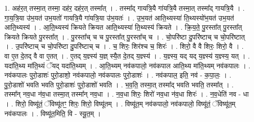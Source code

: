 \documentclass[17pt]{extarticle}
\begin{document}
1. अह॑र॒त् तस्मा॒त् तस्मा॒ दह॑र॒ दह॑र॒त् तस्मा᳚त् । . तस्मा᳚द् गायत्रि॒यै गा॑यत्रि॒यै तस्मा॒त् तस्मा᳚द् गायत्रि॒यै । . गा॒य॒त्रि॒या उ॑भ॒यत॑ उभ॒यतो॑ गायत्रि॒यै गा॑यत्रि॒या उ॑भ॒यतः॑ । . उ॒भ॒यत॑ आति॒थ्यस्या॑ ति॒थ्यस्यो॑भ॒यत॑ उभ॒यत॑ आति॒थ्यस्य॑ । . आ॒ति॒थ्यस्य॑ क्रियते क्रियत आति॒थ्यस्या॑ ति॒थ्यस्य॑ क्रियते । . क्रि॒य॒ते॒ पु॒रस्ता᳚त् पु॒रस्ता᳚त् क्रियते क्रियते पु॒रस्ता᳚त् । . पु॒रस्ता᳚च् च च पु॒रस्ता᳚त् पु॒रस्ता᳚च् च । . चो॒परि॑ष्टा दु॒परि॑ष्टाच् च चो॒परि॑ष्टात् । . उ॒परि॑ष्टाच् च चो॒परि॑ष्टा दु॒परि॑ष्टाच् च । . च॒ शिरः॒ शिर॑श्च च॒ शिरः॑ । . शिरो॒ वै वै शिरः॒ शिरो॒ वै । . वा ए॒त दे॒तद् वै वा ए॒तत् । . ए॒तद् य॒ज्ञ्स्य॑ य॒ज्ञ् स्यै॒त दे॒तद् य॒ज्ञ्स्य॑ । . य॒ज्ञ्स्य॒ यद् यद् य॒ज्ञ्स्य॑ य॒ज्ञ्स्य॒ यत् । . यदा॑ति॒थ्य मा॑ति॒थ्यं ॅयद् यदा॑ति॒थ्यम् । . आ॒ति॒थ्यम् नव॑कपालो॒ नव॑कपाल आति॒थ्य मा॑ति॒थ्यम् नव॑कपालः । . नव॑कपालः पुरो॒डाशः॑ पुरो॒डाशो॒ नव॑कपालो॒ नव॑कपालः पुरो॒डाशः॑ । . नव॑कपाल॒ इति॒ नव॑ - क॒पा॒लः॒ । . पु॒रो॒डाशो॑ भवति भवति पुरो॒डाशः॑ पुरो॒डाशो॑ भवति । . भ॒व॒ति॒ तस्मा॒त् तस्मा᳚द् भवति भवति॒ तस्मा᳚त् । . तस्मा᳚न् नव॒धा न॑व॒धा तस्मा॒त् तस्मा᳚न् नव॒धा । . न॒व॒धा शिरः॒ शिरो॑ नव॒धा न॑व॒धा शिरः॑ । . न॒व॒धेति॑ नव - धा । . शिरो॒ विष्यू॑तं॒ ॅविष्यू॑तꣳ॒॒ शिरः॒ शिरो॒ विष्यू॑तम् । . विष्यू॑त॒म् नव॑कपालो॒ नव॑कपालो॒ विष्यू॑तं॒ ॅविष्यू॑त॒म् नव॑कपालः । . विष्यू॑त॒मिति॒ वि - स्यू॒त॒म् । \newline
\end{document}
